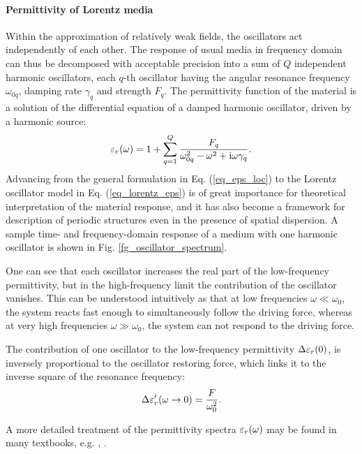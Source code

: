 \paragraph{Permittivity of Lorentz media} Within the approximation of relatively weak fields, the oscillators act independently of each other.
The response of usual media in frequency domain can thus be decomposed with acceptable precision into a sum of $Q$ independent harmonic oscillators, each $q$-th oscillator having the angular resonance frequency $\omega_{0q}$, damping rate $\gamma_q$ and strength $F_q$.
The permittivity function of the material is a solution of the differential equation of a damped harmonic oscillator, driven by a harmonic source:
\begin{equation} \varepsilon_r(\omega) = 1 + \sum_{q=1}^Q \frac{F_q}{\omega_{0q}^2 - \omega^2 + {\mathrm i}\omega\gamma_q}. \label{eq_lorentz_eps}\end{equation} 
Advancing from the general formulation in Eq. (\ref{eq_eps_loc}) to the Lorentz oscillator model in Eq. (\ref{eq_lorentz_eps}) is of great importance for theoretical interpretation of the material response, and it has also become a framework for description of periodic structures even in the presence of spatial dispersion.  %
A sample time- and frequency-domain response of a medium with one harmonic oscillator is shown in Fig. \ref{fg_oscillator_spectrum}.

One can see that each oscillator increases the real part of the low-frequency permittivity, but in the high-frequency limit the contribution of the oscillator vanishes. This can be understood intuitively as that at low frequencies $\omega \ll \omega_0$, the system reacts fast enough to simultaneously follow the driving force, whereas at very high frequencies $\omega \gg \omega_0$, the system can not respond to the driving force.

The contribution of one oscillator to the low-frequency permittivity $\Delta\varepsilon_r(0)$, is inversely proportional to the oscillator restoring force, which links it to the inverse square of the resonance frequency:
\begin{equation} \Delta \varepsilon_r'(\omega\rightarrow0) = \frac{F}{\omega_0^{2}}.  \label{eq_delta_eps} \end{equation}

A more detailed treatment of the permittivity spectra $\varepsilon_r(\omega)$ may be found in many textbooks, e.g. \cite[p. 454]{klingshirn2007semiconductor}, \cite{dresselhaus1966optical}. 

